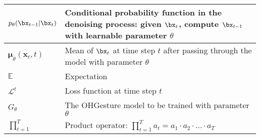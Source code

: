 \begin{center}
\begin{tabular}{|p{3cm}|p{11cm}|}
\hline
$p_{\theta} (\bx_{t-1} | \bx_{t})$ & Conditional probability function in the denoising process: given $\bx_t$, compute $\bx_{t-1}$ with learnable parameter $\theta$ \\
\hline
$\boldsymbol{\mu}_\theta(\mathbf{x}_t, t)$ & Mean of $\bx_t$ at time step $t$ after passing through the model with parameter $\theta$ \\
\hline
$\mathbb{E}$ & Expectation \\
\hline
$\mathcal{L}^t$ & Loss function at time step $t$ \\
\hline
$G_\theta$ & The OHGesture model to be trained with parameter $\theta$ \\
\hline
$\prod^T_{t=1}$ & Product operator: $\prod_{t=1}^T a_t = a_1 \cdot a_2 \cdot \ldots \cdot a_T$ \\
\hline
\end{tabular}
\end{center}

\pagebreak
